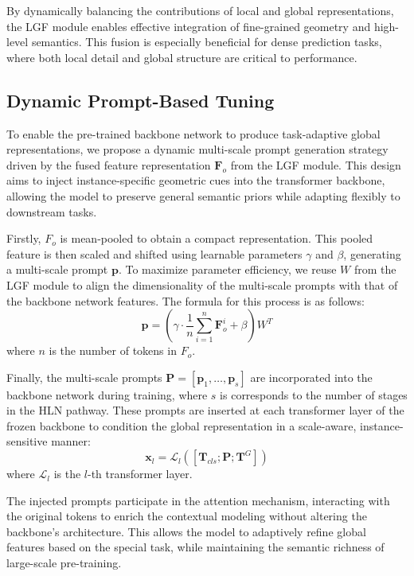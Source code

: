 By dynamically balancing the contributions of local and global representations, the LGF module enables effective integration of fine-grained geometry and high-level semantics. This fusion is especially beneficial for dense prediction tasks, where both local detail and global structure are critical to performance.

\subsection{Dynamic Prompt-Based Tuning}
\label{sec:FT_backbone}
To enable the pre-trained backbone network to produce task-adaptive global representations, we propose a dynamic multi-scale prompt generation strategy driven by the fused feature representation $\mathbf{F}_{o}$ from the LGF module. This design aims to inject instance-specific geometric cues into the transformer backbone, allowing the model to preserve general semantic priors while adapting flexibly to downstream tasks.

Firstly, $F_{o}$ is mean-pooled to obtain a compact representation. This pooled feature is then scaled and shifted using learnable parameters $\gamma$ and $\beta$, generating a multi-scale prompt $\mathbf{p}$. To maximize parameter efficiency, we reuse $W$ from the LGF module to align the dimensionality of the multi-scale prompts with that of the backbone network features. The formula for this process is as follows:
\begin{equation}
	\mathbf{p} = \left(\gamma \cdot \frac{1}{n} \sum_{i=1}^{n} \mathbf{F}_o^i + \beta \right) W^T
\end{equation}
where $n$ is the number of tokens in $F_o$.

Finally, the multi-scale prompts $\mathbf{P}=[\mathbf{p}_{1}, \ldots, \mathbf{p}_{s}]$ are incorporated into the backbone network during training, where $s$ is corresponds to the number of stages in the HLN pathway. These prompts are inserted at each transformer layer of the frozen backbone to condition the global representation in a scale-aware, instance-sensitive manner:
\begin{equation}
	\mathbf{x}_l = \mathcal{L}_l\left([\mathbf{T}_{cls}; \mathbf{P}; \mathbf{T}^{G}]\right)
\end{equation}
where $\mathcal{L}_l$ is the $l$-th transformer layer. 

The injected prompts participate in the attention mechanism, interacting with the original tokens to enrich the contextual modeling without altering the backbone’s architecture. This allows the model to adaptively refine global features based on the special task, while maintaining the semantic richness of large-scale pre-training.

